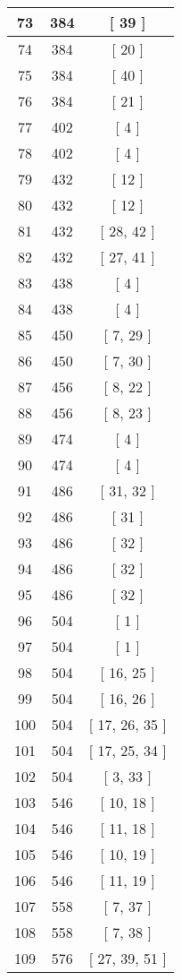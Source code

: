 \begin{center}
\begin{longtable}[H]{|| c c c ||}
\hline
73 & 384 & [ 39 ] \\ 
\hline
74 & 384 & [ 20 ] \\ 
\hline
75 & 384 & [ 40 ] \\ 
\hline
76 & 384 & [ 21 ] \\ 
\hline
77 & 402 & [ 4 ] \\ 
\hline
78 & 402 & [ 4 ] \\ 
\hline
79 & 432 & [ 12 ] \\ 
\hline
80 & 432 & [ 12 ] \\ 
\hline
81 & 432 & [ 28, 42 ] \\ 
\hline
82 & 432 & [ 27, 41 ] \\ 
\hline
83 & 438 & [ 4 ] \\ 
\hline
84 & 438 & [ 4 ] \\ 
\hline
85 & 450 & [ 7, 29 ] \\ 
\hline
86 & 450 & [ 7, 30 ] \\ 
\hline
87 & 456 & [ 8, 22 ] \\ 
\hline
88 & 456 & [ 8, 23 ] \\ 
\hline
89 & 474 & [ 4 ] \\ 
\hline
90 & 474 & [ 4 ] \\ 
\hline
91 & 486 & [ 31, 32 ] \\ 
\hline
92 & 486 & [ 31 ] \\ 
\hline
93 & 486 & [ 32 ] \\ 
\hline
94 & 486 & [ 32 ] \\ 
\hline
95 & 486 & [ 32 ] \\ 
\hline
96 & 504 & [ 1 ] \\ 
\hline
97 & 504 & [ 1 ] \\ 
\hline
98 & 504 & [ 16, 25 ] \\ 
\hline
99 & 504 & [ 16, 26 ] \\ 
\hline
100 & 504 & [ 17, 26, 35 ] \\ 
\hline
101 & 504 & [ 17, 25, 34 ] \\ 
\hline
102 & 504 & [ 3, 33 ] \\ 
\hline
103 & 546 & [ 10, 18 ] \\ 
\hline
104 & 546 & [ 11, 18 ] \\ 
\hline
105 & 546 & [ 10, 19 ] \\ 
\hline
106 & 546 & [ 11, 19 ] \\ 
\hline
107 & 558 & [ 7, 37 ] \\ 
\hline
108 & 558 & [ 7, 38 ] \\ 
\hline
109 & 576 & [ 27, 39, 51 ] \\ 

\end{longtable}
\end{center}
